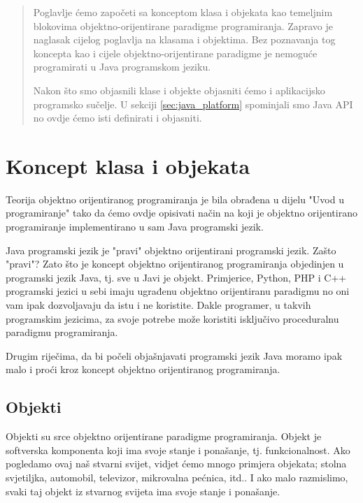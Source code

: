 \label{chap:programming_language_concepts}

\begin{abstract}
    Poglavlje ćemo započeti sa konceptom klasa i objekata kao temeljnim blokovima objektno-orijentirane paradigme programiranja. Zapravo je naglasak cijelog poglavlja na klasama i objektima. Bez poznavanja tog koncepta kao i cijele objektno-orijentirane paradigme je nemoguće programirati u Java programskom jeziku.
    
    Nakon što smo objasnili klase i objekte objasniti ćemo i aplikacijsko programsko sučelje. U sekciji \ref{sec:java_platform} spominjali smo Java API no ovdje ćemo isti definirati i objasniti.
\end{abstract}

\section{Koncept klasa i objekata}
Teorija objektno orijentiranog programiranja je bila obrađena u dijelu "Uvod u programiranje" tako da ćemo ovdje opisivati način na koji je objektno orijentirano programiranje implementirano u sam Java programski jezik.

Java programski jezik je "pravi" objektno orijentirani programski jezik. Zašto "pravi"? Zato što je koncept objektno orijentiranog programiranja objedinjen u programski jezik Java, tj. sve u Javi je objekt. Primjerice, Python, PHP i C++ programski jezici u sebi imaju ugrađenu objektno orijentiranu paradigmu no oni vam ipak dozvoljavaju da istu i ne koristite. Dakle programer, u takvih programskim jezicima, za svoje potrebe može koristiti isključivo proceduralnu paradigmu programiranja.

Drugim riječima, da bi počeli objašnjavati programski jezik Java moramo ipak malo i proći kroz koncept objektno orijentiranog programiranja.

\subsection{Objekti}
Objekti su srce objektno orijentirane paradigme programiranja. Objekt je softverska komponenta koji ima svoje stanje i ponašanje, tj. funkcionalnost. Ako pogledamo ovaj naš stvarni svijet, vidjet ćemo mnogo primjera objekata; stolna svjetiljka, automobil, televizor, mikrovalna pećnica, itd.. I ako malo razmislimo, svaki taj objekt iz stvarnog svijeta ima svoje stanje i ponašanje.

